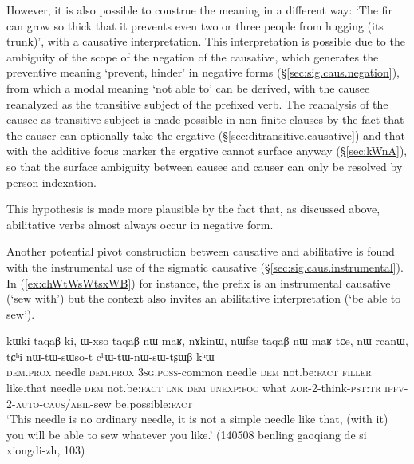 However, it is also possible to construe the meaning in a different way: `The fir can grow so thick that it prevents even two or three people from hugging (its trunk)', with a causative interpretation. This interpretation is possible due to the ambiguity of the scope of the negation of the causative, which generates the preventive meaning `prevent, hinder' in negative forms (§\ref{sec:sig.caus.negation}), from which a modal meaning `not able to' can be derived, with the causee reanalyzed as the transitive subject of the  prefixed verb. The reanalysis of the causee as transitive subject is made possible in non-finite clauses by the fact that the causer can optionally take the ergative (§\ref{sec:ditransitive.causative}) and that with the additive focus marker  the ergative cannot surface anyway (§\ref{sec:kWnA}), so that the surface ambiguity between causee and causer can only be resolved by person indexation. 

This hypothesis is made more plausible by the fact that, as discussed above, abilitative verbs almost always occur in negative form.

Another potential pivot construction between causative and abilitative is found with the instrumental use of the sigmatic causative (§\ref{sec:sig.caus.instrumental}). In (\ref{ex:chWtWsWtsxWB}) for instance, the  prefix is an instrumental causative (`sew with') but the context also invites an abilitative interpretation (`be able to sew').

\begin{exe}
\ex \label{ex:chWtWsWtsxWB}
\gll  kɯki taqaβ ki, ɯ-xso taqaβ nɯ maʁ, nɤkinɯ, nɯfse taqaβ nɯ maʁ tɕe, nɯ rcanɯ, tɕʰi nɯ-tɯ-sɯso-t cʰɯ-tɯ-nɯ-sɯ-tʂɯβ kʰɯ  \\
\textsc{dem}.\textsc{prox} needle \textsc{dem}.\textsc{prox} \textsc{3sg}.\textsc{poss}-common needle \textsc{dem} not.be:\textsc{fact} \textsc{filler} like.that needle \textsc{dem} not.be:\textsc{fact} \textsc{lnk} \textsc{dem} \textsc{unexp}:\textsc{foc} what \textsc{aor}-2-think-\textsc{pst}:\textsc{tr} \textsc{ipfv}-2-\textsc{auto}-\textsc{caus/abil}-sew be.possible:\textsc{fact} \\
\glt `This needle is no ordinary needle, it is not a simple needle like that, (with it) you will be able to sew whatever you like.' (140508 benling gaoqiang de si xiongdi-zh, 103)
\end{exe}
   
